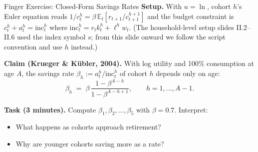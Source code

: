 \documentclass[aspectratio=169,11pt]{beamer}
\newcommand{\emphc}[1]{\textcolor{harvardcrimson}{#1}}
\begin{document}
\begin{frame}{\emphc{Finger Exercise:} Closed-Form Savings Rates}
\small
\textbf{Setup.}  With $u = \ln$, cohort $h$'s Euler equation reads $1/c_t^h = \beta\,\mathbb{E}_t[r_{t+1}/c_{t+1}^{h+1}]$ and the budget constraint is $c_t^h + a_t^h = \text{inc}_t^h$ where $\text{inc}_t^h = r_t k_t^h + \ell^h w_t$.  (The household-level setup slides II.2--II.6 used the index symbol $s$; from this slide onward we follow the script convention and use $h$ instead.)

\vspace{0.4em}
\textbf{Claim (Krueger \& K\"ubler, 2004).}  With log utility and 100\% consumption at age $A$, the savings rate $\beta_h := a_t^h/\text{inc}_t^h$ of cohort $h$ depends only on age:
\[
\beta_h \;=\; \beta\,\frac{1 - \beta^{A-h}}{1 - \beta^{A-h+1}}, \qquad h = 1, \ldots, A-1.
\]

\vspace{0.4em}
\textbf{Task (3 minutes).}  Compute $\beta_1, \beta_2, \ldots, \beta_5$ with $\beta = 0.7$.  Interpret:
\begin{itemize}
\item What happens as cohorts approach retirement?
\item Why are younger cohorts saving more as a \emphc{rate}?
\end{itemize}
\end{frame}
\end{document}
